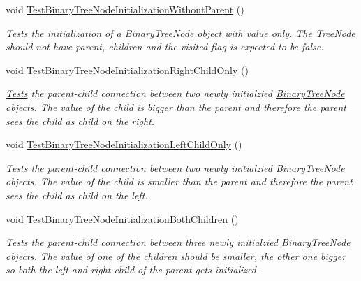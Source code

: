 \begin{DoxyCompactItemize}
\item 
void \hyperlink{class_binary_tree_amortized_analyis_1_1_tests_1_1_binary_tree_node_tests_adbf03a4f515c53e6a2d36757b41998e3}{Test\+Binary\+Tree\+Node\+Initialization\+Without\+Parent} ()
\begin{DoxyCompactList}\small\item\em \hyperlink{namespace_binary_tree_amortized_analyis_1_1_tests}{Tests} the initialization of a \hyperlink{class_binary_tree_amortized_analyis_1_1_binary_tree_node}{Binary\+Tree\+Node} object with value only. The Tree\+Node should not have parent, children and the visited flag is expected to be false. \end{DoxyCompactList}\item 
void \hyperlink{class_binary_tree_amortized_analyis_1_1_tests_1_1_binary_tree_node_tests_a6905de60fa81fec3bd1a9f5b48324113}{Test\+Binary\+Tree\+Node\+Initialization\+Right\+Child\+Only} ()
\begin{DoxyCompactList}\small\item\em \hyperlink{namespace_binary_tree_amortized_analyis_1_1_tests}{Tests} the parent-\/child connection between two newly initialzied \hyperlink{class_binary_tree_amortized_analyis_1_1_binary_tree_node}{Binary\+Tree\+Node} objects. The value of the child is bigger than the parent and therefore the parent sees the child as child on the right. \end{DoxyCompactList}\item 
void \hyperlink{class_binary_tree_amortized_analyis_1_1_tests_1_1_binary_tree_node_tests_ac7e12540c46eee3c405dc6a97301e10c}{Test\+Binary\+Tree\+Node\+Initialization\+Left\+Child\+Only} ()
\begin{DoxyCompactList}\small\item\em \hyperlink{namespace_binary_tree_amortized_analyis_1_1_tests}{Tests} the parent-\/child connection between two newly initialzied \hyperlink{class_binary_tree_amortized_analyis_1_1_binary_tree_node}{Binary\+Tree\+Node} objects. The value of the child is smaller than the parent and therefore the parent sees the child as child on the left. \end{DoxyCompactList}\item 
void \hyperlink{class_binary_tree_amortized_analyis_1_1_tests_1_1_binary_tree_node_tests_a22d4aca649e70db43727243f3c63f4f3}{Test\+Binary\+Tree\+Node\+Initialization\+Both\+Children} ()
\begin{DoxyCompactList}\small\item\em \hyperlink{namespace_binary_tree_amortized_analyis_1_1_tests}{Tests} the parent-\/child connection between three newly initialzied \hyperlink{class_binary_tree_amortized_analyis_1_1_binary_tree_node}{Binary\+Tree\+Node} objects. The value of one of the children should be smaller, the other one bigger so both the left and right child of the parent gets initialized. \end{DoxyCompactList}\item 

\end{DoxyCompactItemize}
